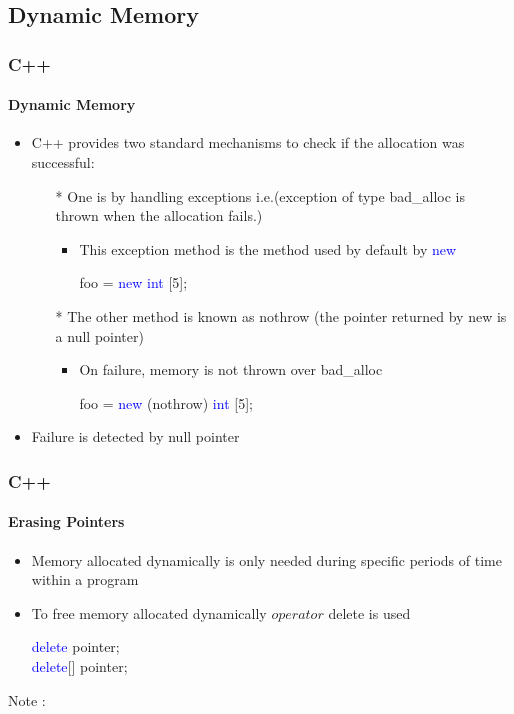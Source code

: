\documentclass[hyperref={pdfpagelabels=true}]{beamer}
\begin{document}
\subsection{Dynamic Memory}
\begin{frame}
\frametitle{C++}
\framesubtitle{Dynamic Memory}
\begin{itemize}[<+->]
\item C++ provides two standard mechanisms to check if the allocation was successful:
\begin{itemize}
\item[*] One is by handling exceptions i.e.(exception of type bad\_alloc is thrown when the allocation fails.)
\begin{itemize}
\item This exception method is the method used by default by \textcolor{blue}{new}
\begin{center}foo = \textcolor{blue}{new int} [5]; \end{center}
\end{itemize}

\item[*]  The other method is known as nothrow (the pointer returned by new is a null pointer) 
\begin{itemize}
\item On failure, memory is not thrown over bad\_alloc
\begin{center}foo = \textcolor{blue}{new} (nothrow) \textcolor{blue}{int} [5]; \end{center}
\end{itemize}
\end{itemize}
\item Failure is detected by null pointer

\end{itemize}
\end{frame}

\begin{frame}
\frametitle{C++}
\framesubtitle{Erasing Pointers}
\begin{itemize}[<+->]
\item Memory allocated dynamically is only needed during specific periods of time within a program
\item  To free memory allocated dynamically $operator$ delete is used
\begin{center}
\textcolor{blue}{
delete} pointer; \\
\textcolor{blue}{delete}[] pointer;
\end{center}
\end{itemize}

Note :
\end{frame}
\end{document}
